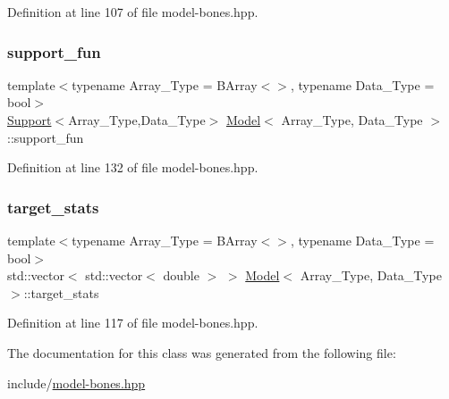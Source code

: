 Definition at line 107 of file model-\/bones.\+hpp.

\mbox{\label{class_model_a192302b6d7402bd4ef6edae623074ad0}} 
\subsubsection{\texorpdfstring{support\+\_\+fun}{support\_fun}}
{\footnotesize\ttfamily template$<$typename Array\+\_\+\+Type  = B\+Array$<$$>$, typename Data\+\_\+\+Type  = bool$>$ \\
\hyperlink{class_support}{Support}$<$Array\+\_\+\+Type,Data\+\_\+\+Type$>$ \hyperlink{class_model}{Model}$<$ Array\+\_\+\+Type, Data\+\_\+\+Type $>$\+::support\+\_\+fun}



Definition at line 132 of file model-\/bones.\+hpp.

\mbox{\label{class_model_ab0f4642a2d4602fabb6774914b7dbd39}} 
\subsubsection{\texorpdfstring{target\+\_\+stats}{target\_stats}}
{\footnotesize\ttfamily template$<$typename Array\+\_\+\+Type  = B\+Array$<$$>$, typename Data\+\_\+\+Type  = bool$>$ \\
std\+::vector$<$ std\+::vector$<$ double $>$ $>$ \hyperlink{class_model}{Model}$<$ Array\+\_\+\+Type, Data\+\_\+\+Type $>$\+::target\+\_\+stats}



Definition at line 117 of file model-\/bones.\+hpp.



The documentation for this class was generated from the following file\+:\begin{DoxyCompactItemize}
\item 
include/\hyperlink{model-bones_8hpp}{model-\/bones.\+hpp}\end{DoxyCompactItemize}
